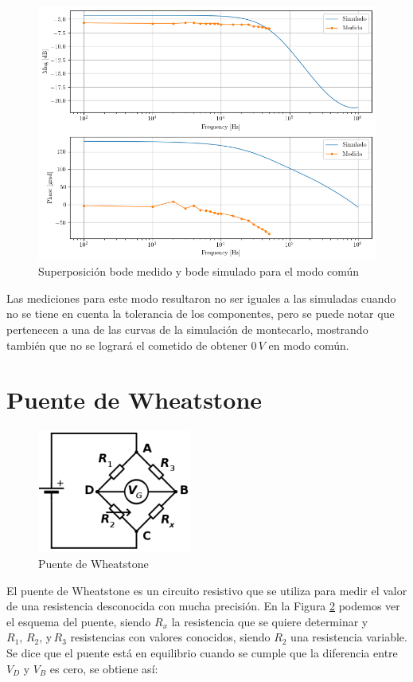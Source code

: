 \begin{figure}[H]
\centering
\includegraphics[scale=0.6]{../Ex3/Bode-COMun.png}
\caption{Superposición bode medido y bode simulado para el modo común}
\label{fig:bodemedidocomun}
\end{figure}

	Las mediciones para este modo resultaron no ser iguales a las simuladas cuando no se tiene en cuenta la tolerancia de los componentes, pero se puede notar que pertenecen a una de las curvas de la simulación de montecarlo, mostrando también que no se logrará el cometido de obtener $0 \, V$ en modo común.
	
\section{Puente de Wheatstone}

\begin{figure}[H]
\centering
\includegraphics[scale=0.6]{../Ex3/puente.png}
\caption{Puente de Wheatstone}
\label{fig:puente}
\end{figure}

	El puente de Wheatstone es un circuito resistivo que se utiliza para medir el valor de una resistencia desconocida con mucha precisión.
	En la Figura \ref{fig:puente} podemos ver el esquema del puente, siendo $R_x$ la resistencia que se quiere determinar y $R_1, \, R_2, \, \text{y} \, R_3$ resistencias con valores conocidos, siendo $R_2$ una resistencia variable. Se dice que el puente está en equilibrio cuando se cumple que la diferencia entre $V_D$ y $V_B$ es cero, se obtiene así:
	
